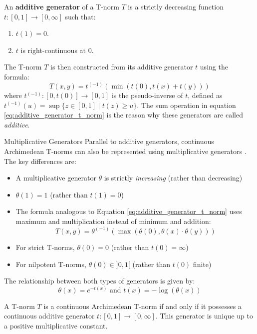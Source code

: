 An \textbf{additive generator} \cite[Def.~3.25]{Klement2000} of a T-norm $T$ is a strictly decreasing function $t: [0,1] \to [0, \infty]$ such that:
\begin{enumerate}
    \item $t(1) = 0$.
    \item $t$ is right-continuous at $0$.
\end{enumerate}
The T-norm $T$ is then constructed from its additive generator $t$ using the formula:
\begin{equation} \label{eq:additive_generator_t_norm}
    T(x,y) = t^{(-1)}( \min(t(0), t(x) + t(y)) )
\end{equation}
where $t^{(-1)}: [0, t(0)] \to [0,1]$ is the pseudo-inverse of $t$, defined as $t^{(-1)}(u) = \sup \{z \in [0,1] \mid t(z) \ge u \}$. The sum operation in equation \ref{eq:additive_generator_t_norm} is the reason why these generators are called \emph{additive}.

\begin{notation}{Multiplicative Generators}
    Parallel to additive generators, continuous Archimedean T-norms can also be represented using multiplicative generators \cite[Def.~3.36]{Klement2000}. The key differences are:
    \begin{itemize}
        \item A multiplicative generator $\theta$ is strictly \emph{increasing} (rather than decreasing)
        \item $\theta(1)=1$ (rather than $t(1)=0$)
        \item The formula analogous to Equation \ref{eq:additive_generator_t_norm} uses maximum and multiplication instead of minimum and addition:
        \[T(x,y) = \theta^{(-1)}(\max(\theta(0), \theta(x) \cdot \theta(y)))\]
        \item For strict T-norms, $\theta(0)=0$ (rather than $t(0)=\infty$)
        \item For nilpotent T-norms, $\theta(0) \in ]0,1[$ (rather than $t(0)$ finite)
    \end{itemize}
    The relationship between both types of generators is given by: \[\theta(x) = e^{-t(x)}\text{ and }t(x) = -\log(\theta(x))\]
    \end{notation}

    \begin{theorem}
        A T-norm $T$ is a continuous Archimedean T-norm if and only if it possesses a continuous additive generator $t: [0,1] \to [0,\infty]$. This generator is unique up to a positive multiplicative constant.
      \end{theorem}
    
